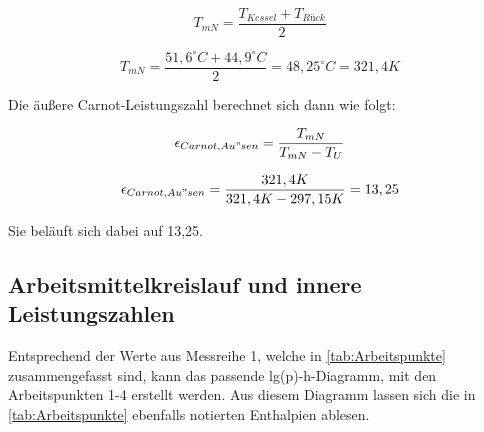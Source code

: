 \begin{equation}
    T_{mN}=\frac{T_{Kessel}+T_{Rück}}{2}
\end{equation}

$$T_{mN}=\frac{51,6^{\circ}C+44,9^{\circ}C}{2}=48,25^{\circ}C= 321,4 K$$

Die äußere Carnot-Leistungszahl berechnet sich dann wie folgt: 

\begin{equation}
\epsilon_{Carnot, Au"sen} = \frac{T_{mN}}{T_{mN}-T_{U}}
\label{eq:110623_aeußere Carnot Leistungszahl}
\end{equation}

$$\epsilon_{Carnot, Au"sen} = \frac{321,4 K}{321,4 K-297,15K} = 13,25$$

Sie beläuft sich dabei auf 13,25.

\subsection{Arbeitsmittelkreislauf und innere Leistungszahlen}
Entsprechend der Werte aus Messreihe 1, welche in \autoref{tab:Arbeitspunkte} zusammengefasst sind, kann das passende
lg(p)-h-Diagramm, mit den Arbeitspunkten 1-4 erstellt werden. Aus diesem Diagramm lassen sich die in \autoref{tab:Arbeitspunkte} ebenfalls
notierten Enthalpien ablesen.

\begin{table}[!h]
    \centering
    \caption{Arbeitspunkte entsprechend Messreihe 1}
    \label{tab:Arbeitspunkte}
    \end{table}

